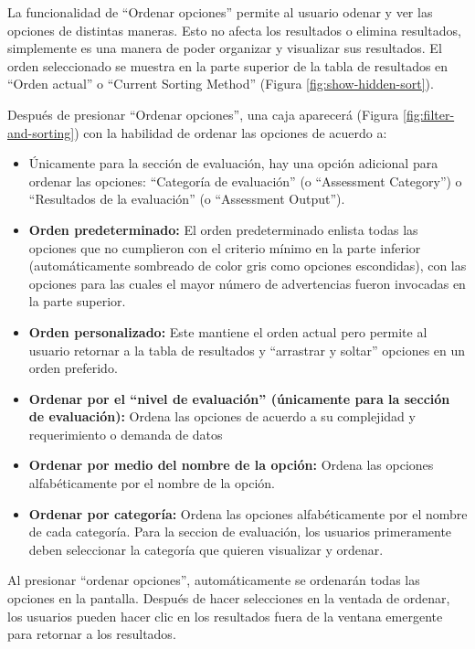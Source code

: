 \documentclass[
  11pt,
]{book}
\providecommand{\tightlist}{%
  \setlength{\itemsep}{0pt}\setlength{\parskip}{0pt}}
\begin{document}
La funcionalidad de ``Ordenar opciones'' permite al usuario odenar y ver las opciones de distintas maneras. Esto no afecta los resultados o elimina resultados, simplemente es una manera de poder organizar y visualizar sus resultados. El orden seleccionado se muestra en la parte superior de la tabla de resultados en ``Orden actual'' o ``Current Sorting Method'' (Figura \ref{fig:show-hidden-sort}).

Después de presionar ``Ordenar opciones'', una caja aparecerá (Figura \ref{fig:filter-and-sorting}) con la habilidad de ordenar las opciones de acuerdo a:

\begin{itemize}
\tightlist
\item
  Únicamente para la sección de evaluación, hay una opción adicional para ordenar las opciones: ``Categoría de evaluación'' (o ``Assessment Category'') o ``Resultados de la evaluación'' (o ``Assessment Output'').
\item
  \textbf{Orden predeterminado:} El orden predeterminado enlista todas las opciones que no cumplieron con el criterio mínimo en la parte inferior (automáticamente sombreado de color gris como opciones escondidas), con las opciones para las cuales el mayor número de advertencias fueron invocadas en la parte superior.
\item
  \textbf{Orden personalizado:} Este mantiene el orden actual pero permite al usuario retornar a la tabla de resultados y ``arrastrar y soltar'' opciones en un orden preferido.
\item
  \textbf{Ordenar por el ``nivel de evaluación'' (únicamente para la sección de evaluación):} Ordena las opciones de acuerdo a su complejidad y requerimiento o demanda de datos
\item
  \textbf{Ordenar por medio del nombre de la opción:} Ordena las opciones alfabéticamente por el nombre de la opción.
\item
  \textbf{Ordenar por categoría:} Ordena las opciones alfabéticamente por el nombre de cada categoría. Para la seccion de evaluación, los usuarios primeramente deben seleccionar la categoría que quieren visualizar y ordenar.
\end{itemize}

Al presionar ``ordenar opciones'', automáticamente se ordenarán todas las opciones en la pantalla. Después de hacer selecciones en la ventada de ordenar, los usuarios pueden hacer clic en los resultados fuera de la ventana emergente para retornar a los resultados.
\end{document}
